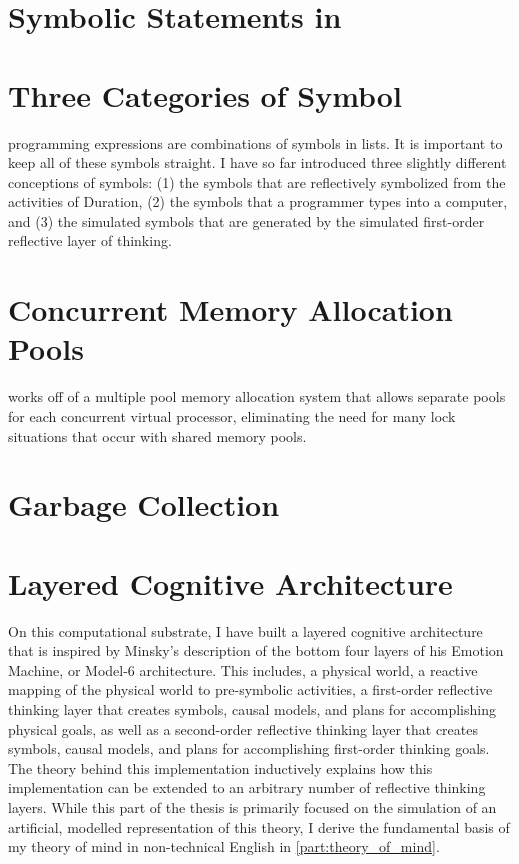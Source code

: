 \section{Symbolic Statements in \SALS}

\section{Three Categories of Symbol}

{\SALS} programming expressions are combinations of symbols in lists.
It is important to keep all of these symbols straight.  I have so far
introduced three slightly different conceptions of symbols: (1) the
symbols that are reflectively symbolized from the activities of
Duration, (2) the symbols that a programmer types into a computer, and
(3) the simulated symbols that are generated by the simulated
first-order reflective layer of thinking.

\section{Concurrent Memory Allocation Pools}

{\SALS} works off of a multiple pool memory allocation system that
allows separate pools for each concurrent virtual processor,
eliminating the need for many lock situations that occur with shared
memory pools.

\section{Garbage Collection}



\section{Layered Cognitive Architecture}

On this computational substrate, I have built a layered cognitive
architecture that is inspired by Minsky's description of the bottom
four layers of his Emotion Machine, or Model-6 architecture.  This
includes, a physical world, a reactive mapping of the physical world
to pre-symbolic activities, a first-order reflective thinking layer
that creates symbols, causal models, and plans for accomplishing
physical goals, as well as a second-order reflective thinking layer
that creates symbols, causal models, and plans for accomplishing
first-order thinking goals.  The theory behind this implementation
inductively explains how this implementation can be extended to an
arbitrary number of reflective thinking layers.  While this part of
the thesis is primarily focused on the simulation of an artificial,
modelled representation of this theory, I derive the fundamental basis
of my theory of mind in non-technical English in
\autoref{part:theory_of_mind}.

